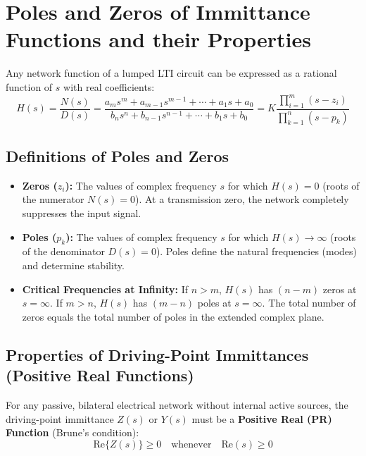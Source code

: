 \documentclass[12pt,a4paper]{article}
\begin{document}
\section{Poles and Zeros of Immittance Functions and their Properties}

Any network function of a lumped LTI circuit can be expressed as a rational function of $s$ with real coefficients:
\begin{equation}
  H(s) = \frac{N(s)}{D(s)} = \frac{a_m s^m + a_{m-1} s^{m-1} + \cdots + a_1 s + a_0}{b_n s^n + b_{n-1} s^{n-1} + \cdots + b_1 s + b_0} = K \frac{\prod_{i=1}^m (s - z_i)}{\prod_{k=1}^n (s - p_k)}
\end{equation}

\subsection{Definitions of Poles and Zeros}

\begin{tcolorbox}[defbox, title={\textbf{Poles and Zeros}}]
\begin{itemize}[leftmargin=*]
  \item \textbf{Zeros ($z_i$):} The values of complex frequency $s$ for which $H(s) = 0$ (roots of the numerator $N(s) = 0$). At a transmission zero, the network completely suppresses the input signal.
  \item \textbf{Poles ($p_k$):} The values of complex frequency $s$ for which $H(s) \to \infty$ (roots of the denominator $D(s) = 0$). Poles define the natural frequencies (modes) and determine stability.
  \item \textbf{Critical Frequencies at Infinity:} If $n > m$, $H(s)$ has $(n - m)$ zeros at $s = \infty$. If $m > n$, $H(s)$ has $(m - n)$ poles at $s = \infty$. The total number of zeros equals the total number of poles in the extended complex plane.
\end{itemize}
\end{tcolorbox}

\subsection{Properties of Driving-Point Immittances (Positive Real Functions)}

For any passive, bilateral electrical network without internal active sources, the driving-point immittance $Z(s)$ or $Y(s)$ must be a \textbf{Positive Real (PR) Function} (Brune's condition):
\begin{equation}
  \text{Re}\{Z(s)\} \ge 0 \quad \text{whenever} \quad \text{Re}(s) \ge 0
\end{equation}
\end{document}
